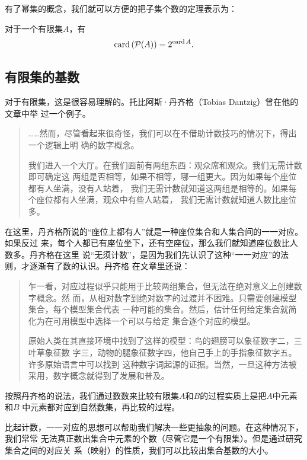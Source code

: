 有了幂集的概念，我们就可以方便的把子集个数的定理表示为：
\begin{rawthm}
    对于一个有限集$A$，有
    \[
        \operatorname{card} \left( \mathcal{P}(A) \right) = 2^{\operatorname{card} A}.
    \]
\end{rawthm}


\subsection{有限集的基数}

对于有限集，这是很容易理解的。托比阿斯·丹齐格（Tobias Dantzig）曾在他的文章中举
过一个例子。\cite{dantzig2007number}

\begin{quotation}
    ……然而，尽管看起来很奇怪，我们可以在不借助计数技巧的情况下，得出一个逻辑上明
    确的数字概念。

    我们进入一个大厅。在我们面前有两组东西：观众席和观众。我们无需计数即可确定这
    两组是否相等，如果不相等，哪一组更大。因为如果每个座位都有人坐满，没有人站着，
    我们无需计数就知道这两组是相等的。如果每个座位都有人坐满，观众中有些人站着，
    我们无需计数就知道人数比座位多。
\end{quotation}

在这里，丹齐格所说的“座位上都有人”就是一种座位集合和人集合间的一一对应。如果反过
来，每个人都已有座位坐下，还有空座位，那么我们就知道座位数比人数多。丹齐格在这里
说“无须计数”，是因为我们先认识了这种“一一对应”的法则，才逐渐有了数的认识。丹齐格
在文章里还说：

\begin{quotation}
    乍一看，对应过程似乎只能用于比较两组集合，但无法在绝对意义上创建数字概念。然
    而，从相对数字到绝对数字的过渡并不困难。只需要创建模型集合，每个模型集合代表
    一种可能的集合。然后，估计任何给定集合就简化为在可用模型中选择一个可以与给定
    集合逐个对应的模型。

    原始人类在其直接环境中找到了这样的模型：鸟的翅膀可以象征数字二，三叶草象征数
    字三，动物的腿象征数字四，他自己手上的手指象征数字五。许多原始语言中可以找到
    这种数字词起源的证据。当然，一旦这种方法被采用，数字概念就得到了发展和普及。
\end{quotation}

按照丹齐格的说法，我们通过数数来比较有限集$A$和$B$的过程实质上是把$A$中元素和$B$
中元素都对应到自然数集，再比较的过程。

比起计数，一一对应的思想可以帮助我们解决一些更抽象的问题。在这种情况下，我们常常
无法真正数出集合中元素的个数（尽管它是一个有限集）。但是通过研究集合之间的对应关
系（映射）的性质，我们可以比较出集合基数的大小。

